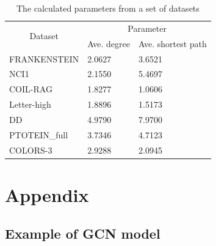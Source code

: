 \documentclass{article}
\begin{document}
\begin{table}[]
    \centering
    \begin{tabular}{@{}lll@{}}
    \toprule
    \multicolumn{1}{c}{\multirow{2}{*}{Dataset}} & \multicolumn{2}{c}{Parameter}                                            \\ \cmidrule(l){2-3} 
    \multicolumn{1}{c}{}                         & \multicolumn{1}{c}{Ave. degree} & \multicolumn{1}{c}{Ave. shortest path} \\ \midrule
    FRANKENSTEIN                                 & 2.0627         & 3.6521                     \\
    NCI1                                         & 2.1550         & 5.4697                     \\
    COIL-RAG                                     & 1.8277         & 1.0606                     \\
    Letter-high                                  & 1.8896         & 1.5173                     \\
    DD                                           & 4.9790         & 7.9700                     \\
    PTOTEIN\_full                                & 3.7346         & 4.7123                     \\
    COLORS-3                                     & 2.9288         & 2.0945                     \\ \bottomrule
    \end{tabular}
    \caption{The calculated parameters from a set of datasets}
    \label{tab:parameter}
\end{table}

\newpage 


\newpage 

\section{Appendix} 
 
\subsection*{Example of GCN model}
\end{document}
